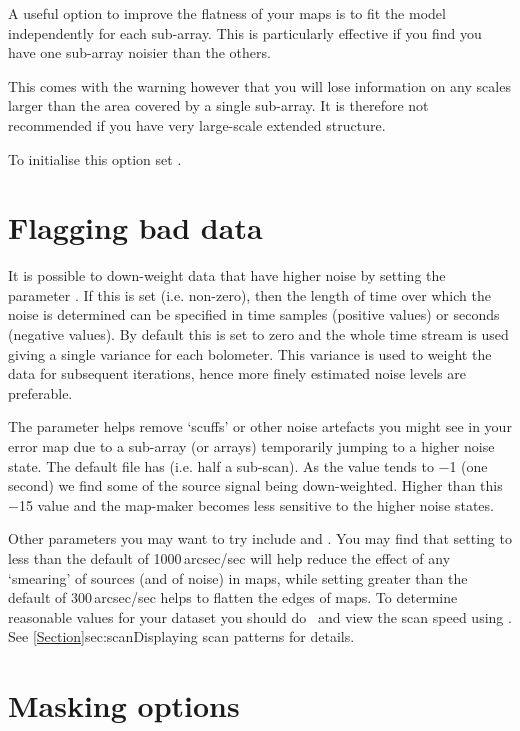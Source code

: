 A useful option to improve the flatness of your maps is to fit the
 model independently for each sub-array. This is
particularly effective if you find you have one sub-array noisier than
the others.

This comes with the warning however that you will lose information on
any scales larger than the area covered by a single sub-array. It is
therefore not recommended if you have very large-scale extended
structure.

To initialise this option set .


\section{Flagging bad data}
\label{sec:noibox}

It is possible to down-weight data that have higher noise by setting
the parameter . If this is set (i.e. non-zero),
then the length of time over which the noise is determined can be
specified in time samples (positive values) or seconds (negative
values). By default this is set to zero and the whole time stream is
used giving a single variance for each bolometer. This variance is
used to weight the data for subsequent iterations, hence more finely
estimated noise levels are preferable.

The parameter  helps remove `scuffs' or other
noise artefacts you might see in your error map due to a sub-array (or
arrays) temporarily jumping to a higher noise state. The default file
has  (i.e. half a sub-scan). As the
value tends to $-$1 (one second) we find some of the source signal being
down-weighted. Higher than this $-$15 value and the map-maker becomes
less sensitive to the higher noise states.

Other parameters you may want to try include  and
. You may find that setting  to less
than the default of 1000\,arcsec/sec will help reduce the effect of any
`smearing' of sources (and of noise) in maps, while setting
 greater than the default of 300\,arcsec/sec helps to
flatten the edges of maps. To determine reasonable values for your
 dataset you should do \jcmtstate\ and view the scan speed using
\topcat. See \cref{Section}{sec:scan}{Displaying scan patterns} for
details.


\section{Masking options}
\label{sec:mask}

